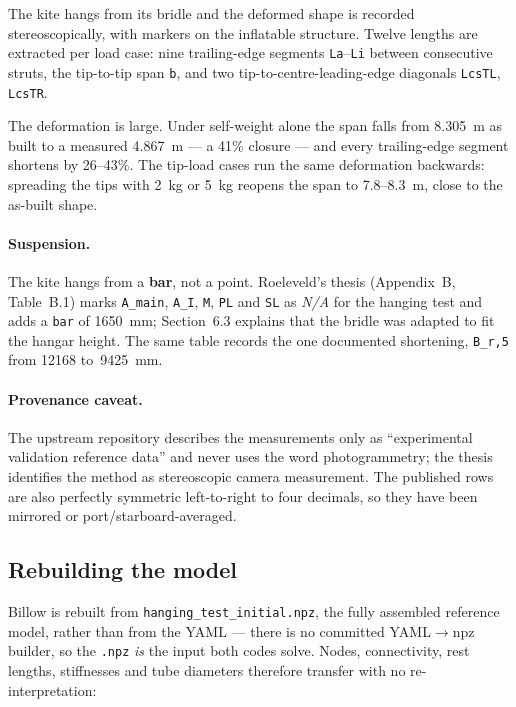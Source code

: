 \documentclass[11pt,a4paper]{article}
\begin{document}
The kite hangs from its bridle and the deformed shape is recorded
stereoscopically, with markers on the inflatable structure. Twelve lengths are
extracted per load case: nine trailing-edge segments \texttt{La}--\texttt{Li}
between consecutive struts, the tip-to-tip span \texttt{b}, and two
tip-to-centre-leading-edge diagonals \texttt{LcsTL}, \texttt{LcsTR}.

The deformation is large. Under self-weight alone the span falls from
\SI{8.305}{m} as built to a measured \SI{4.867}{m} --- a 41\% closure --- and
every trailing-edge segment shortens by 26--43\%. The tip-load cases run the
same deformation backwards: spreading the tips with \SI{2}{kg} or \SI{5}{kg}
reopens the span to \SI{7.8}{}--\SI{8.3}{m}, close to the as-built shape.

\paragraph{Suspension.} The kite hangs from a \textbf{bar}, not a point.
Roeleveld's thesis (Appendix~B, Table~B.1) marks \texttt{A\_main},
\texttt{A\_I}, \texttt{M}, \texttt{PL} and \texttt{SL} as \emph{N/A} for the
hanging test and adds a \texttt{bar} of \SI{1650}{mm}; Section~6.3 explains
that the bridle was adapted to fit the hangar height. The same table records
the one documented shortening, \texttt{B\_r,5} from \SI{12168}{}
to~\SI{9425}{mm}.

\paragraph{Provenance caveat.} The upstream repository describes the
measurements only as ``experimental validation reference data'' and never uses
the word photogrammetry; the thesis identifies the method as stereoscopic
camera measurement. The published rows are also perfectly symmetric
left-to-right to four decimals, so they have been mirrored or
port/starboard-averaged.

\subsection{Rebuilding the model}

Billow is rebuilt from \texttt{hanging\_test\_initial.npz}, the fully assembled
reference model, rather than from the YAML --- there is no committed
YAML$\rightarrow$npz builder, so the \texttt{.npz} \emph{is} the input both
codes solve. Nodes, connectivity, rest lengths, stiffnesses and tube diameters
therefore transfer with no re-interpretation:
\end{document}
